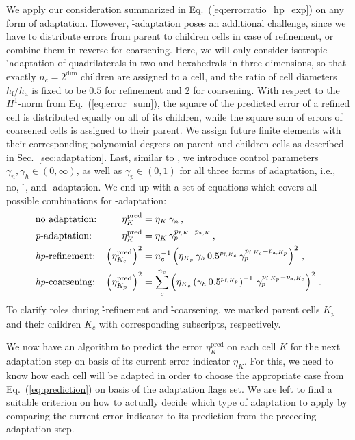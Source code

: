 We apply our consideration summarized in Eq.~(\ref{eq:errorratio_hp_exp}) on any form of adaptation. However, \h-adaptation poses an additional challenge, since we have to distribute errors from parent to children cells in case of refinement, or combine them in reverse for coarsening. Here, we will only consider isotropic \h-adaptation of quadrilaterals in two and hexahedrals in three dimensions, so that exactly $n_c = 2^\text{dim}$ children are assigned to a cell, and the ratio of cell diameters $h_\text{f} / h_\text{a}$ is fixed to be $0.5$ for refinement and $2$ for coarsening. With respect to the $H^1$-norm from Eq.~(\ref{eq:error_sum}), the square of the predicted error of a refined cell is distributed equally on all of its children, while the square sum of errors of coarsened cells is assigned to their parent. We assign future finite elements with their corresponding polynomial degrees on parent and children cells as described in Sec.~\ref{sec:adaptation}. Last, similar to \textcite{melenk2001}, we introduce control parameters $\gamma_n, \gamma_h \in (0, \infty)$, as well as $\gamma_p \in (0,1)$ for all three forms of adaptation, i.e., no, \h-, and \p-adaptation. We end up with a set of equations which covers all possible combinations for \hp-adaptation:
\begin{subequations}
\begin{align}
&\text{no adaptation:} & \eta^\text{pred}_K &= \eta_K \, \gamma_n \,\text{,} \\
&\text{\textit{p}-adaptation:} & \eta^\text{pred}_K &= \eta_K \, \gamma_p^{p_{\text{f},K} - p_{\text{a},K}} \,\text{,} \\
&\text{\textit{hp}-refinement:} & \left( \eta^\text{pred}_{K_c} \right)^2 &= n_c^{-1} \left( \eta_{K_p} \, \gamma_h \, 0.5^{p_{\text{f},K_c}} \, \gamma_p^{p_{\text{f},K_c} - p_{\text{a},K_p}} \right)^2 \,\text{,} \\
&\text{\textit{hp}-coarsening:} & \left( \eta^\text{pred}_{K_p} \right)^2 &= \sum\limits_c^{n_c} \left( \eta_{K_c} \left( \gamma_h \, 0.5^{p_{\text{f},K_p}} \right)^{-1} \, \gamma_p^{p_{\text{f},K_p} - p_{\text{a},K_c}} \right)^2 \,\text{.} 
\end{align}
\label{eq:prediction}
\end{subequations}
To clarify roles during \h-refinement and \h-coarsening, we marked parent cells $K_p$ and their children $K_c$ with corresponding subscripts, respectively.

We now have an algorithm to predict the error $\eta^\text{pred}_K$ on each cell $K$ for the next adaptation step on basis of its current error indicator $\eta_K$. For this, we need to know how each cell will be adapted in order to choose the appropriate case from Eq.~(\ref{eq:prediction}) on basis of the adaptation flags set. We are left to find a suitable criterion on how to actually decide which type of adaptation to apply by comparing the current error indicator to its prediction from the preceding adaptation step.

